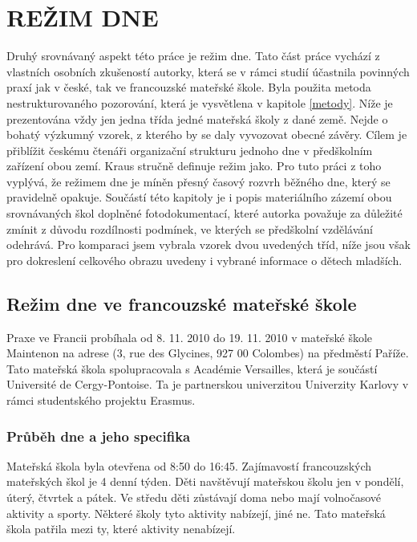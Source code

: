 \chapter{REŽIM DNE}
\label{rezim}

	Druhý srovnávaný aspekt této práce je režim dne. Tato část práce vychází z vlastních osobních zkušeností autorky, která se v rámci studií účastnila povinných praxí jak v české, tak ve francouzské mateřské škole. Byla použita metoda nestrukturovaného pozorování, která je vysvětlena v kapitole \ref{metody}. Níže je prezentována vždy jen jedna třída jedné mateřská školy z dané země. Nejde o bohatý výzkumný vzorek, z kterého by se daly vyvozovat obecné závěry. Cílem je přiblížit českému čtenáři organizační strukturu jednoho dne v předškolním zařízení obou zemí. Kraus stručně definuje režim jako\textit{}. \citep[s.~700]{Kraus}
	Pro tuto práci z toho vyplývá, že režimem dne je míněn přesný časový rozvrh běžného dne, který se pravidelně opakuje.
	Součástí této kapitoly je i popis materiálního zázemí obou srovnávaných škol doplněné fotodokumentací, které autorka považuje za důležité zmínit z důvodu rozdílnosti podmínek, ve kterých se předškolní vzdělávání odehrává.
	Pro komparaci jsem vybrala vzorek dvou uvedených tříd, níže jsou však pro dokreslení celkového obrazu uvedeny i vybrané informace o dětech mladších.

	\section{Režim dne ve francouzské mateřské škole}

		Praxe ve Francii probíhala od 8. 11. 2010 do 19. 11. 2010 v mateřské škole Maintenon na adrese (3, rue des Glycines, 927 00 Colombes) na předměstí Paříže. Tato mateřská škola spolupracovala s Académie Versailles, která je součástí Université de Cergy-Pontoise. Ta je partnerskou univerzitou Univerzity Karlovy v rámci studentského projektu Erasmus. 


		\subsection{Průběh dne a jeho specifika}

			Mateřská škola byla otevřena od 8:50 do 16:45. Zajímavostí francouzských mateřských škol je 4 denní týden. Děti navštěvují mateřskou školu jen v pondělí, úterý, čtvrtek a pátek. Ve středu děti zůstávají doma nebo mají volnočasové aktivity a sporty. Některé školy tyto aktivity nabízejí, jiné ne. Tato mateřská škola patřila mezi ty, které aktivity nenabízejí. 
			
